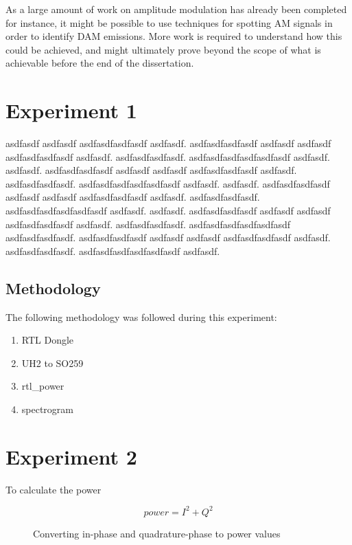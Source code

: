 \documentclass[runningheads,a4paper]{llncs}
\begin{document}
As a large amount of work on amplitude modulation has already been completed for instance, it might be possible to use techniques for spotting AM signals in order to identify \gls{DAM} emissions. More work is required to understand how this could be achieved, and might ultimately prove beyond the scope of what is achievable before the end of the dissertation.

\section*{Experiment 1}
asdfasdf asdfasdf asdfasdfasdfasdf asdfasdf. asdfasdfasdfasdf asdfasdf asdfasdf asdfasdfasdfasdf asdfasdf. asdfasdfasdfasdf. asdfasdfasdfasdfasdfasdf asdfasdf. asdfasdf. asdfasdfasdfasdf asdfasdf asdfasdf asdfasdfasdfasdf asdfasdf. asdfasdfasdfasdf. asdfasdfasdfasdfasdfasdf asdfasdf. asdfasdf. asdfasdfasdfasdf asdfasdf asdfasdf asdfasdfasdfasdf asdfasdf. asdfasdfasdfasdf. asdfasdfasdfasdfasdfasdf asdfasdf. asdfasdf. asdfasdfasdfasdf asdfasdf asdfasdf asdfasdfasdfasdf asdfasdf. asdfasdfasdfasdf. asdfasdfasdfasdfasdfasdf asdfasdfasdfasdf. asdfasdfasdfasdf asdfasdf asdfasdf asdfasdfasdfasdf asdfasdf. asdfasdfasdfasdf. asdfasdfasdfasdfasdfasdf asdfasdf.


\subsection*{Methodology}
The following methodology was followed during this experiment:

\begin{enumerate}
	\item RTL Dongle
	\item UH2 to SO259 
	\item rtl\_power
	\item spectrogram
\end{enumerate}


\section*{Experiment 2}

To calculate the power 

%
\begin{figure}[here]
	\centering
	\begin{equation}
	power = I^2 + Q^2
	\end{equation}
	\caption{Converting in-phase and quadrature-phase to power values}
	\label{fig:power_formula}
\end{figure}
%
\end{document}
